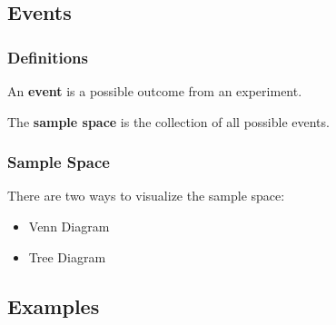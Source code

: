 \subsection{Events}

\begin{frame}
  \frametitle{Definitions}

  \begin{definition}
    An \textbf{event} is a possible outcome from an experiment.
  \end{definition}

  \begin{definition}
    The \textbf{sample space} is the collection of all possible
    events.
  \end{definition}

\end{frame}


\begin{frame}
  \frametitle{Sample Space}

  There are two ways to visualize the sample space:
  \begin{itemize}
  \item Venn Diagram
  \item Tree Diagram
  \end{itemize}

\end{frame}

\subsection{Examples}

